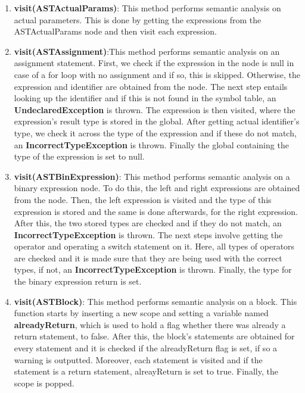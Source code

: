 \documentclass{article}
\begin{document}
			\begin{enumerate}
				\item \textbf{visit(ASTActualParams)}: This method performs semantic analysis on actual parameters. This is done by getting the expressions from the ASTActualParams node and then visit each expression.
				
					\item \textbf{visit(ASTAssignment)}:This method performs semantic analysis on an assignment statement. First, we check if the expression in the node is null in case of a for loop with no assignment and if so, this is skipped. Otherwise, the expression and identifier are obtained from the node. The next step entails looking up the identifier and if this is not found in the symbol table, an \textbf{UndeclaredException} is thrown. The expression is then visited, where the expression's result type is stored in the global. After getting actual identifier's type, we check it across the type of the expression and if these do not match, an \textbf{IncorrectTypeException} is thrown. Finally the global containing the type of the expression is set to null.
			
					\item \textbf{visit(ASTBinExpression)}: This method performs semantic analysis on a binary expression node. To do this, the left and right expressions are obtained from the node. Then, the left expression is visited and the type of this expression is stored and the same is done afterwards, for the right expression. After this, the two stored types are checked and if they do not match, an \textbf{IncorrectTypeException} is thrown. The next steps involve getting the operator and operating a switch statement on it. Here, all types of operators are checked and it is made sure that they are being used with the correct types, if not,  an \textbf{IncorrectTypeException} is thrown. Finally, the type for the binary expression return is set.
			
					\item \textbf{visit(ASTBlock)}: This method performs semantic analysis on a block. This function starts by inserting a new scope and setting a variable named \textbf{alreadyReturn}, which is used to hold a flag whether there was already a return statement, to false. After this, the block's statements are obtained for every statement and it is checked if the alreadyReturn flag is set, if so a warning is outputted. Moreover, each statement is visited and if the statement is a return statement, alreayReturn is set to true. Finally, the scope is popped.
			

\end{enumerate}
\end{document}
